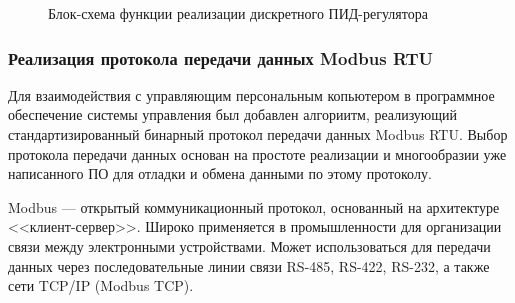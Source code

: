         \begin{figure}[h!]
            \caption{Блок-схема функции реализации дискретного ПИД-регулятора}
            \label{fig:bs-pid}
        \end{figure}
        \clearpage

    \subsubsection{Реализация протокола передачи данных Modbus RTU}
        Для взаимодействия с управляющим персональным копьютером в программное
        обеспечение системы управления был добавлен алгориитм, реализующий
        стандартизированный бинарный протокол передачи данных Modbus RTU. Выбор
        протокола передачи данных основан на простоте реализации и многообразии
        уже написанного ПО для отладки и обмена данными по этому протоколу.

        Modbus — открытый коммуникационный протокол, основанный на архитектуре
        <<клиент-сервер>>. Широко применяется в промышленности для организации
        связи между электронными устройствами. Может использоваться для
        передачи данных через последовательные линии связи RS-485, RS-422,
        RS-232, а также сети TCP/IP (Modbus TCP).

